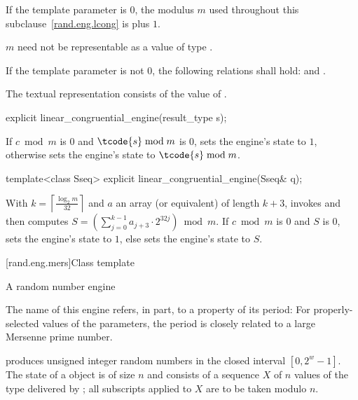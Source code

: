\pnum
If the template parameter
 is $0$,
the modulus $m$
used throughout this subclause~\ref{rand.eng.lcong}
is  plus $1$.
\begin{note}
 $m$ need not be representable
 as a value of type .
\end{note}

\pnum
If the template parameter
 is not $0$,
the following relations shall hold:
and
  .

\pnum
The textual representation
consists of
the value of .

%
\begin{itemdecl}
explicit linear_congruential_engine(result_type s);
\end{itemdecl}

\begin{itemdescr}
\pnum
\effects
 If $c \bmod m$ is $0$ and $\tcode{s} \bmod m$ is $0$,
 sets the engine's state to $1$,
 otherwise sets the engine's state to $\tcode{s} \bmod m$.
\end{itemdescr}

%
\begin{itemdecl}
template<class Sseq> explicit linear_congruential_engine(Sseq& q);
\end{itemdecl}

\begin{itemdescr}
\pnum
\effects
 With
 $k = \left\lceil \frac{\log_2 m}{32} \right\rceil$
 and $a$ an array (or equivalent)
 of length $k + 3$,
 invokes 
 and then computes
 $S = \left(\sum_{j = 0}^{k - 1} a_{j + 3} \cdot 2^{32j} \right) \bmod m$.
 If $c \bmod m$ is $0$ and $S$ is $0$,
 sets the engine's state to $1$,
 else sets the engine's state
 to $S$.
\end{itemdescr}


[rand.eng.mers]{Class template }%
%

\pnum
A  random number
engine
\begin{footnote}
The name of this engine refers, in part, to a property of its period:
 For properly-selected values of the parameters,
 the period is closely related to a large Mersenne prime number.
\end{footnote}
produces unsigned integer random numbers
in the closed interval $[0,2^w-1]$.
The
state
of a  object 
is of size $n$
and consists of a sequence $X$
of $n$ values of the type delivered by ;
all subscripts applied to $X$ are to be taken modulo $n$.

